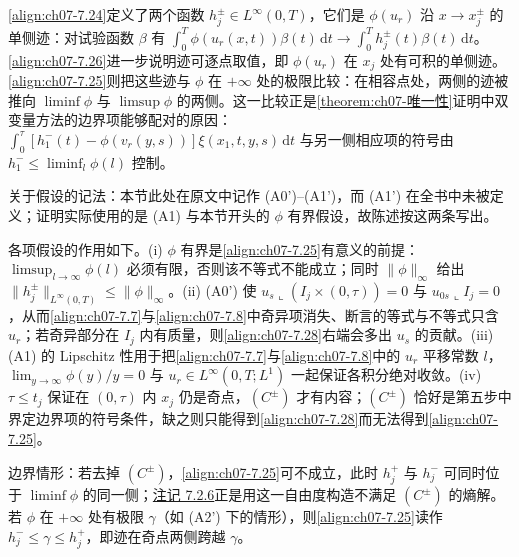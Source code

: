 \documentclass[../../main.tex]{subfiles}%
\begin{document}
\begin{remark}\label{remark:ch07-7.2.6动机}
\eqref{align:ch07-7.24}定义了两个函数 $h_j^\pm\in L^\infty(0,T)$，它们是 $\phi(u_r)$ 沿 $x\to x_j^\pm$ 的单侧迹：对试验函数 $\beta$ 有 $\int_0^T\phi(u_r(x,t))\beta(t)\,\mathrm{d}t\to\int_0^Th_j^\pm(t)\beta(t)\,\mathrm{d}t$。\eqref{align:ch07-7.26}进一步说明迹可逐点取值，即 $\phi(u_r)$ 在 $x_j$ 处有可积的单侧迹。\eqref{align:ch07-7.25}则把这些迹与 $\phi$ 在 $+\infty$ 处的极限比较：在相容点处，两侧的迹被推向 $\liminf\phi$ 与 $\limsup\phi$ 的两侧。这一比较正是\cref{theorem:ch07-唯一性}证明中双变量方法的边界项能够配对的原因：$\int_0^\tau[h_1^-(t)-\phi(v_r(y,s))]\xi(x_1,t,y,s)\,\mathrm{d}t$ 与另一侧相应项的符号由 $h_1^-\leqslant\liminf_l\phi(l)$ 控制。

关于假设的记法：本节此处在原文中记作 (A0')--(A1')，而 (A1') 在全书中未被定义；证明实际使用的是 (A1) 与本节开头的 $\phi$ 有界假设，故陈述按这两条写出。

各项假设的作用如下。(i) $\phi$ 有界是\eqref{align:ch07-7.25}有意义的前提：$\limsup_{l\to\infty}\phi(l)$ 必须有限，否则该不等式不能成立；同时 $\|\phi\|_\infty$ 给出 $\|h_j^\pm\|_{L^\infty(0,T)}\leqslant\|\phi\|_\infty$。(ii) (A0') 使 $u_s\llcorner(I_j\times(0,\tau))=0$ 与 $u_{0s}\llcorner I_j=0$，从而\eqref{align:ch07-7.7}与\eqref{align:ch07-7.8}中奇异项消失、断言的等式与不等式只含 $u_r$；若奇异部分在 $I_j$ 内有质量，则\eqref{align:ch07-7.28}右端会多出 $u_s$ 的贡献。(iii) (A1) 的 Lipschitz 性用于把\eqref{align:ch07-7.7}与\eqref{align:ch07-7.8}中的 $u_r$ 平移常数 $l$，$\lim_{y\to\infty}\phi(y)/y=0$ 与 $u_r\in L^\infty(0,T;L^1)$ 一起保证各积分绝对收敛。(iv) $\tau\leqslant t_j$ 保证在 $(0,\tau)$ 内 $x_j$ 仍是奇点，$(C^\pm)$ 才有内容；$(C^\pm)$ 恰好是第五步中界定边界项的符号条件，缺之则只能得到\eqref{align:ch07-7.28}而无法得到\eqref{align:ch07-7.25}。

边界情形：若去掉 $(C^\pm)$，\eqref{align:ch07-7.25}可不成立，此时 $h_j^+$ 与 $h_j^-$ 可同时位于 $\liminf\phi$ 的同一侧；\hyperref[remark:ch07-7.2.6]{注记 7.2.6}正是用这一自由度构造不满足 $(C^\pm)$ 的熵解。若 $\phi$ 在 $+\infty$ 处有极限 $\gamma$（如 (A2') 下的情形），则\eqref{align:ch07-7.25}读作 $h_j^-\leqslant\gamma\leqslant h_j^+$，即迹在奇点两侧跨越 $\gamma$。
\end{remark}
\end{document}
